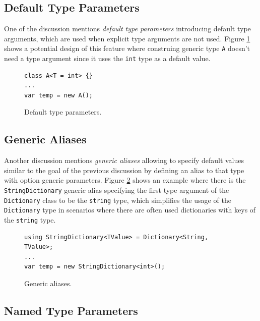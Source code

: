 \subsection{Default Type Parameters} \label{sect07:is1}

One of the discussion \cite{online:DefTypeParam} mentions \textit{default type parameters} introducing default type arguments, which are used when explicit type arguments are not used. 
Figure \ref{img19:defTypeParam} shows a potential design of this feature where construing generic type \texttt{A} doesn’t need a type argument since it uses the \texttt{int} type as a default value. 
\begin{figure}[h]
\begin{lstlisting}[style=csharp]
class A<T = int> {}
...
var temp = new A();
\end{lstlisting}
\caption{Default type parameters.}
\label{img19:defTypeParam}
\end{figure}

\subsection{Generic Aliases} \label{sect08:is2}

Another discussion \cite{online:GenAlias} mentions \textit{generic aliases} allowing to specify default values similar to the goal of the previous discussion by defining an alias to that type with option generic parameters. 
Figure \ref{img20:genAlias} shows an example where there is the \texttt{StringDictionary} generic alias specifying the first type argument of the \texttt{Dictionary} class to be the \texttt{string} type, which simplifies the usage of the \texttt{Dictionary} type in scenarios where there are often used dictionaries with keys of the \texttt{string} type.
\begin{figure}[h]
\begin{lstlisting}[style=csharp]
using StringDictionary<TValue> = Dictionary<String, TValue>;
...
var temp = new StringDictionary<int>();
\end{lstlisting}
\caption{Generic aliases.}
\label{img20:genAlias}
\end{figure}

\subsection{Named Type Parameters} \label{sect09:is3}

